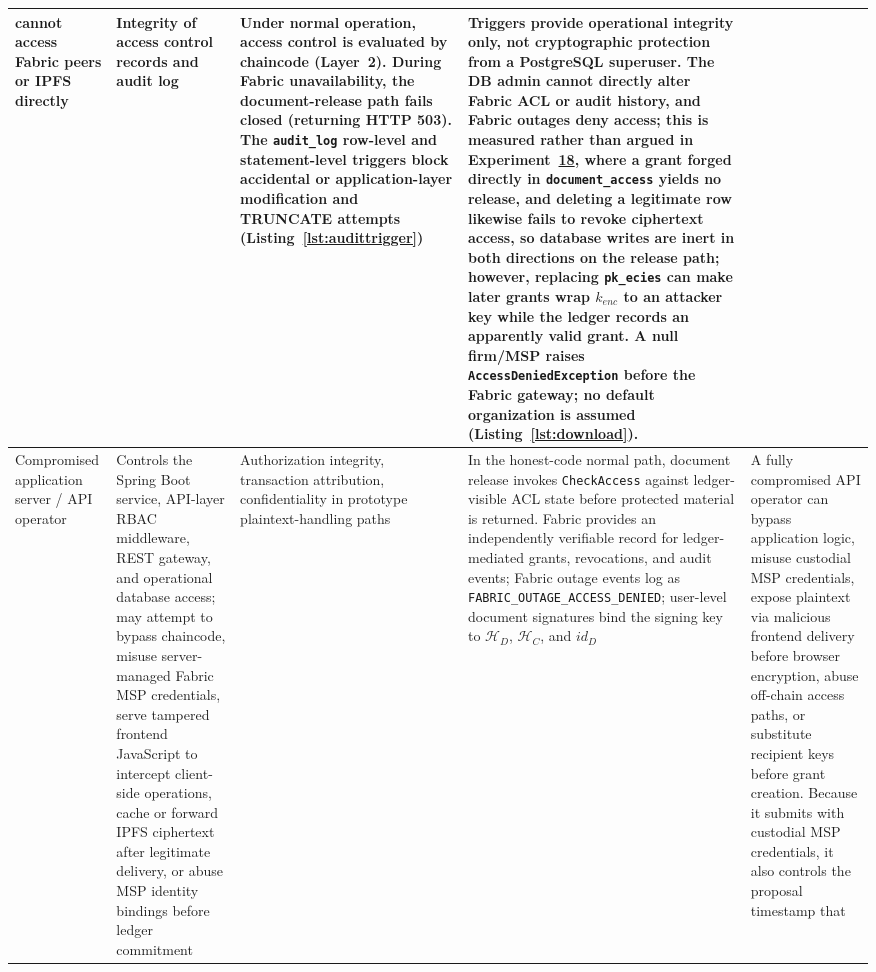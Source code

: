 \documentclass[preprint,12pt]{elsarticle}
\begin{document}
\begin{xltabular}{\textwidth}{|p{2.2cm}|X|p{2.0cm}|X|X|}
cannot access Fabric peers or IPFS directly &
Integrity of access control records and audit log &
Under normal operation, access control is evaluated by chaincode
(Layer~2). During Fabric unavailability, the document-release path
fails closed (returning HTTP 503). The \texttt{audit\_log} row-level
and statement-level triggers block accidental or application-layer
modification and TRUNCATE attempts (Listing~\ref{lst:audittrigger}) &
Triggers provide operational integrity only, not cryptographic
protection from a PostgreSQL superuser. The DB admin cannot directly
alter Fabric ACL or audit history, and Fabric outages deny access; this
is measured rather than argued in
Experiment~\hyperref[sec:exp_db_mutation]{18}, where a grant forged
directly in \texttt{document\_access} yields no release, and deleting a
legitimate row likewise fails to revoke ciphertext access, so database
writes are inert in both directions on the release path;
however, replacing \texttt{pk\_ecies} can make later grants wrap
$k_{enc}$ to an attacker key while the ledger records an apparently
valid grant. A null firm/MSP raises \texttt{AccessDeniedException}
before the Fabric gateway; no default organization is assumed
(Listing~\ref{lst:download}). \\
\hline
Compromised application server / API operator &
Controls the Spring Boot service, API-layer RBAC middleware, REST gateway, and operational database access; may attempt to bypass chaincode, misuse
server-managed Fabric MSP credentials, serve tampered frontend
JavaScript to intercept client-side operations, cache or forward IPFS
ciphertext after legitimate delivery, or abuse MSP identity bindings
before ledger commitment &
Authorization integrity, transaction attribution, confidentiality in
prototype plaintext-handling paths &
In the honest-code normal path, document release invokes
\texttt{CheckAccess} against ledger-visible ACL state before protected
material is returned. Fabric provides an independently verifiable
record for ledger-mediated grants, revocations, and audit events; Fabric outage events log as \texttt{FABRIC\_OUTAGE\_}\allowbreak\texttt{ACCESS\_DENIED}; user-level
document signatures bind the signing key to $\mathcal{H}_D$, $\mathcal{H}_C$, and $id_D$ &
A fully compromised API operator can bypass application logic, misuse
custodial MSP credentials, expose plaintext via malicious frontend
delivery before browser encryption, abuse off-chain access paths, or
substitute recipient keys before grant creation. Because it submits with
custodial MSP credentials, it also controls the proposal timestamp that

\end{xltabular}
\end{document}
